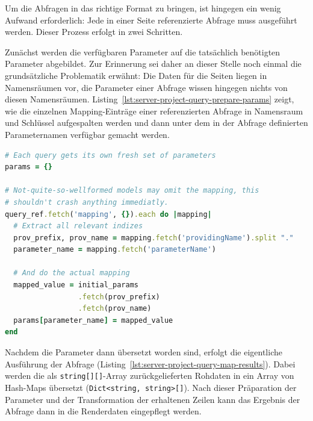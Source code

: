 Um die Abfragen in das richtige Format zu bringen, ist hingegen ein wenig Aufwand erforderlich: Jede in einer Seite referenzierte Abfrage muss ausgeführt werden. Dieser Prozess erfolgt in zwei Schritten.

Zunächst werden die verfügbaren Parameter auf die tatsächlich benötigten Parameter abgebildet. Zur Erinnerung sei daher an dieser Stelle noch einmal die grundsätzliche Problematik erwähnt: Die Daten für die Seiten liegen in Namensräumen vor, die Parameter einer Abfrage wissen hingegen nichts von diesen Namensräumen. Listing~\ref{lst:server-project-query-prepare-params} zeigt, wie die einzelnen Mapping-Einträge einer referenzierten Abfrage in Namensraum und Schlüssel aufgespalten werden und dann unter dem in der Abfrage definierten Parameternamen verfügbar gemacht werden.

\begin{lstlisting}[float=p, language=Ruby, caption={Renderdaten einer Abfrage (1): Parameter binden}, label={lst:server-project-query-prepare-params}]
# Each query gets its own fresh set of parameters
params = {}

# Not-quite-so-wellformed models may omit the mapping, this
# shouldn't crash anything immediatly.
query_ref.fetch('mapping', {}).each do |mapping|
  # Extract all relevant indizes
  prov_prefix, prov_name = mapping.fetch('providingName').split "."
  parameter_name = mapping.fetch('parameterName')
  
  # And do the actual mapping
  mapped_value = initial_params
                 .fetch(prov_prefix)
                 .fetch(prov_name)
  params[parameter_name] = mapped_value
end
\end{lstlisting}

Nachdem die Parameter dann übersetzt worden sind, erfolgt die eigentliche Ausführung der Abfrage (Listing~\ref{lst:server-project-query-map-results}). Dabei werden die als \texttt{string[][]}-Array zurückgelieferten Rohdaten in ein Array von Hash-Maps übersetzt (\texttt{Dict<string, string>[]}). Nach dieser Präparation der Parameter und der Transformation der erhaltenen Zeilen kann das Ergebnis der Abfrage dann in die Renderdaten eingepflegt werden.

